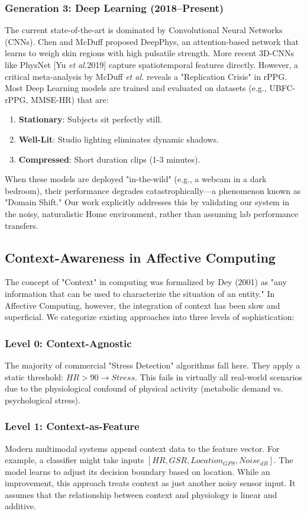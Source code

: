 \documentclass[journal]{IEEEtran}
\newcommand{\etal}{\textit{et al.}}
\begin{document}
\subsubsection{Generation 3: Deep Learning (2018--Present)}
The current state-of-the-art is dominated by Convolutional Neural Networks (CNNs). Chen and McDuff \cite{deepphys} proposed DeepPhys, an attention-based network that learns to weigh skin regions with high pulsatile strength. More recent 3D-CNNs like PhysNet [Yu \etal 2019] capture spatiotemporal features directly.
However, a critical meta-analysis by McDuff \etal \cite{mcduff_rppg} reveals a "Replication Crisis" in rPPG. Most Deep Learning models are trained and evaluated on datasets (e.g., UBFC-rPPG, MMSE-HR) that are:
\begin{enumerate}
    \item \textbf{Stationary}: Subjects sit perfectly still.
    \item \textbf{Well-Lit}: Studio lighting eliminates dynamic shadows.
    \item \textbf{Compressed}: Short duration clips (1-3 minutes).
\end{enumerate}
When these models are deployed "in-the-wild" (e.g., a webcam in a dark bedroom), their performance degrades catastrophically—a phenomenon known as "Domain Shift." Our work explicitly addresses this by validating our system in the noisy, naturalistic Home environment, rather than assuming lab performance transfers.

\subsection{Context-Awareness in Affective Computing}
The concept of "Context" in computing was formalized by Dey (2001) as "any information that can be used to characterize the situation of an entity." In Affective Computing, however, the integration of context has been slow and superficial.
We categorize existing approaches into three levels of sophistication:
\subsubsection{Level 0: Context-Agnostic}
The majority of commercial "Stress Detection" algorithms fall here. They apply a static threshold: $HR > 90 \to Stress$. This fails in virtually all real-world scenarios due to the physiological confound of physical activity (metabolic demand vs. psychological stress).
\subsubsection{Level 1: Context-as-Feature}
Modern multimodal systems append context data to the feature vector. For example, a classifier might take inputs $[HR, GSR, Location_{GPS}, Noise_{dB}]$. The model learns to adjust its decision boundary based on location.
While an improvement, this approach treats context as just another noisy sensor input. It assumes that the relationship between context and physiology is linear and additive.
\end{document}
